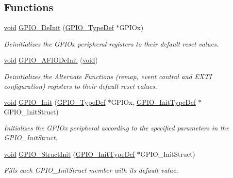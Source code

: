 \subsection*{Functions}
\begin{DoxyCompactItemize}
\item 
\hyperlink{usb__devapi_8h_afabf60e7f57651d6d595a02c75f07cd0}{void} \hyperlink{group___g_p_i_o___exported___functions_gaa60bdf3182c44b5fa818f237042f52ee}{G\+P\+I\+O\+\_\+\+De\+Init} (\hyperlink{struct_g_p_i_o___type_def}{G\+P\+I\+O\+\_\+\+Type\+Def} $\ast$G\+P\+I\+Ox)
\begin{DoxyCompactList}\small\item\em Deinitializes the G\+P\+I\+Ox peripheral registers to their default reset values. \end{DoxyCompactList}\item 
\hyperlink{usb__devapi_8h_afabf60e7f57651d6d595a02c75f07cd0}{void} \hyperlink{group___g_p_i_o___exported___functions_ga7f645e6b6146818c3d6c19021e70170c}{G\+P\+I\+O\+\_\+\+A\+F\+I\+O\+De\+Init} (\hyperlink{usb__devapi_8h_afabf60e7f57651d6d595a02c75f07cd0}{void})
\begin{DoxyCompactList}\small\item\em Deinitializes the Alternate Functions (remap, event control and E\+X\+TI configuration) registers to their default reset values. \end{DoxyCompactList}\item 
\hyperlink{usb__devapi_8h_afabf60e7f57651d6d595a02c75f07cd0}{void} \hyperlink{group___g_p_i_o___exported___functions_ga71abf9404261370d03cca449b88d3a65}{G\+P\+I\+O\+\_\+\+Init} (\hyperlink{struct_g_p_i_o___type_def}{G\+P\+I\+O\+\_\+\+Type\+Def} $\ast$G\+P\+I\+Ox, \hyperlink{struct_g_p_i_o___init_type_def}{G\+P\+I\+O\+\_\+\+Init\+Type\+Def} $\ast$G\+P\+I\+O\+\_\+\+Init\+Struct)
\begin{DoxyCompactList}\small\item\em Initializes the G\+P\+I\+Ox peripheral according to the specified parameters in the G\+P\+I\+O\+\_\+\+Init\+Struct. \end{DoxyCompactList}\item 
\hyperlink{usb__devapi_8h_afabf60e7f57651d6d595a02c75f07cd0}{void} \hyperlink{group___g_p_i_o___exported___functions_gab28de41278e7f8c63d0851e2733b10df}{G\+P\+I\+O\+\_\+\+Struct\+Init} (\hyperlink{struct_g_p_i_o___init_type_def}{G\+P\+I\+O\+\_\+\+Init\+Type\+Def} $\ast$G\+P\+I\+O\+\_\+\+Init\+Struct)
\begin{DoxyCompactList}\small\item\em Fills each G\+P\+I\+O\+\_\+\+Init\+Struct member with its default value. \end{DoxyCompactList}\item 

\end{DoxyCompactItemize}
